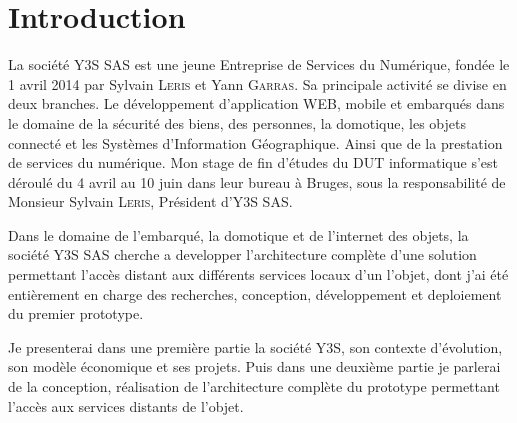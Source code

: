 \chapter*{Introduction}
\label{chap:introduction}

La société Y3S SAS est une jeune Entreprise de Services du Numérique, fondée le 1\ier{} avril 2014 par Sylvain \textsc{Leris} et Yann \textsc{Garras}. Sa principale activité se divise en deux branches. Le développement d'application WEB, mobile et embarqués dans le domaine de la sécurité des biens, des personnes, la domotique, les objets connecté et les Systèmes d'Information Géographique. Ainsi que de la prestation de services du numérique. Mon stage de fin d'études du DUT informatique s'est déroulé du 4 avril  au 10 juin dans leur bureau à Bruges, sous la responsabilité de Monsieur Sylvain \textsc{Leris}, Président d'Y3S SAS.

Dans le domaine de l'embarqué, la domotique et de l'internet des objets, la société Y3S SAS cherche a developper l'architecture complète d'une solution permettant l'accès distant aux différents services locaux d'un l'objet, dont j'ai été entièrement en charge des recherches, conception, développement et deploiement du premier prototype.

Je presenterai dans une première partie la société Y3S, son contexte d'évolution, son modèle économique et ses projets. Puis dans une deuxième partie je parlerai de la conception, réalisation de l'architecture complète du prototype permettant l'accès aux services distants de l'objet.

